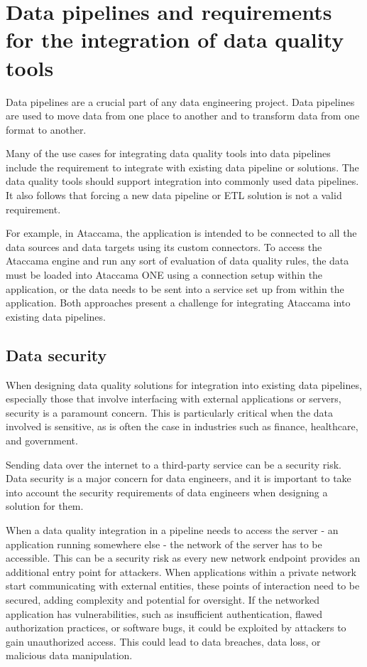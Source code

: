\section{Data pipelines and requirements for the integration of data quality tools}

Data pipelines are a crucial part of any data engineering project. Data pipelines are used to move data from one place to another and to transform data from one format to another. 

Many of the use cases for integrating data quality tools into data pipelines include the requirement to integrate with existing data pipeline or solutions. The data quality tools should support integration into commonly used data pipelines. It also follows that forcing a new data pipeline or ETL solution is not a valid requirement. 

For example, in Ataccama, the application is intended to be connected to all the data sources and data targets using its custom connectors. To access the Ataccama engine and run any sort of evaluation of data quality rules, the data must be loaded into Ataccama ONE using a connection setup within the application, or the data needs to be sent into a service set up from within the application. Both approaches present a challenge for integrating Ataccama into existing data pipelines.

\subsection{Data security}

When designing data quality solutions for integration into existing data pipelines, especially those that involve interfacing with external applications or servers, security is a paramount concern. This is particularly critical when the data involved is sensitive, as is often the case in industries such as finance, healthcare, and government.

 Sending data over the internet to a third-party service can be a security risk. Data security is a major concern for data engineers, and it is important to take into account the security requirements of data engineers when designing a solution for them.

When a data quality integration in a pipeline needs to access the server - an application running somewhere else - the network of the server has to be accessible. This can be a security risk as every new network endpoint provides an additional entry point for attackers. When applications within a private network start communicating with external entities, these points of interaction need to be secured, adding complexity and potential for oversight.  If the networked application has vulnerabilities, such as insufficient authentication, flawed authorization practices, or software bugs, it could be exploited by attackers to gain unauthorized access. This could lead to data breaches, data loss, or malicious data manipulation. 


